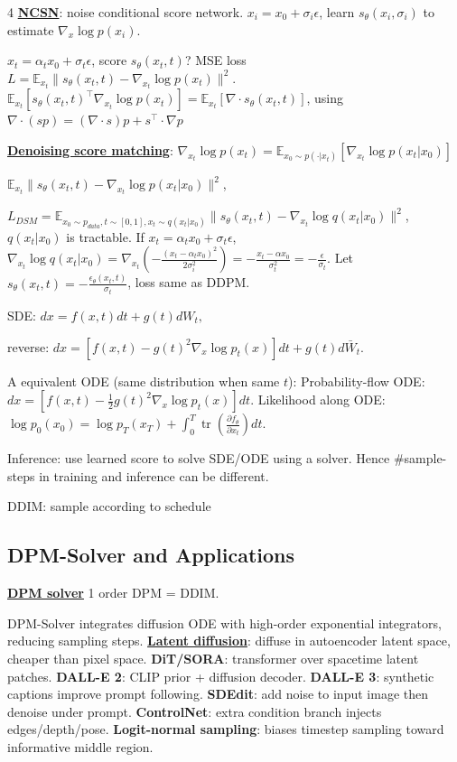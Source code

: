 \documentclass{article}
\newcommand{\key}[1]{\textbf{#1}}
\newcommand{\lowterm}[1]{\textbf{\underline{#1}}}
\newcommand{\E}{\mathbb{E}}
\newcommand{\1}{\mathbf 1}
\DeclareMathOperator{\tr}{tr}
\begin{document}
\begin{multicols*}{4}
\lowterm{NCSN}: noise conditional score network. 
$x_i=x_0+\sigma_i\epsilon$, learn $s_\theta(x_i,\sigma_i)$ to estimate $\nabla_x \log p(x_i)$.  

$x_t=\alpha_tx_0+\sigma_t\epsilon$, score $s_\theta(x_t,t)$? MSE loss $L=\E_{x_t}\|s_\theta(x_t,t)-\nabla_{x_t}\log p(x_t)\|^2$. $\E_{x_t}[s_\theta(x_t,t)^\top \nabla_{x_t}\log p(x_t)]= \E_{x_t}[\nabla\cdot s_\theta(x_t,t)]$, using $\nabla\cdot(sp)=(\nabla\cdot s)p+s^\top \cdot\nabla p$


\lowterm{Denoising score matching}: 
$\nabla_{x_t}\log p(x_t)=\E_{x_0\sim p(\cdot|x_t)}[\nabla_{x_t}\log p(x_t|x_0)]$
 
$\E_{x_t}\|s_\theta(x_t,t)-\nabla_{x_t}\log p(x_t|x_0)\|^2$, 

$L_{DSM}=\E_{x_0\sim p_{data},t\sim[0,1],x_t\sim q(x_t|x_0)} \|s_\theta(x_t,t)-\nabla_{x_t}\log q(x_t|x_0)\|^2$, $q(x_t|x_0)$ is tractable. 
If $x_t=\alpha_t x_0+\sigma_t\epsilon$, $\nabla_{x_t}\log q(x_t|x_0)=\nabla_{x_t}(-\frac{(x_t-\alpha_tx_0)^2}{2\sigma_i^2})=-\frac{x_t-\alpha x_0}{\sigma_t^2}=-\frac{\epsilon}{\sigma_t}$. Let $s_\theta(x_t,t)=-\frac{\epsilon_\theta(x_t,t)}{\sigma_t}$, loss same as DDPM. 


SDE:
\(
dx=f(x,t)dt+g(t)dW_t,
\)

reverse: $dx=[f(x,t)-g(t)^2\nabla_x\log p_t(x)]dt+g(t)d\bar W_t$.

A equivalent ODE (same distribution when same $t$):
Probability-flow ODE:
\(
dx=\left[f(x,t)-\frac12g(t)^2\nabla_x\log p_t(x)\right]dt.
\)
Likelihood along ODE:
\(
\log p_0(x_0)=\log p_T(x_T)+\int_0^T\tr\left(\frac{\partial f_\theta}{\partial x_t}\right)dt.
\)

Inference: use learned score to solve SDE/ODE using a solver. Hence \#sample-steps in training and inference can be different. 

DDIM: sample according to schedule 


\subsection{DPM-Solver and Applications}

\lowterm{DPM solver} 1 order DPM = DDIM. 

DPM-Solver integrates diffusion ODE with high-order exponential integrators, reducing sampling steps. \lowterm{Latent diffusion}: diffuse in autoencoder latent space, cheaper than pixel space. \key{DiT/SORA}: transformer over spacetime latent patches. \key{DALL-E 2}: CLIP prior + diffusion decoder. \key{DALL-E 3}: synthetic captions improve prompt following. \key{SDEdit}: add noise to input image then denoise under prompt. \key{ControlNet}: extra condition branch injects edges/depth/pose. \key{Logit-normal sampling}: biases timestep sampling toward informative middle region.


\end{multicols*}
\end{document}
